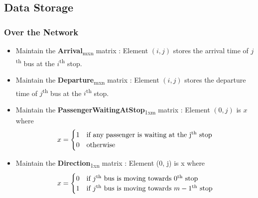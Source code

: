 \subsection{Data Storage}
\subsubsection{Over the Network}

\begin{itemize}

\item Maintain the \textbf{Arrival}\textsubscript{mxn} matrix : Element $(i, j)$ stores the arrival time of $j$\textsuperscript{th} bus at the $i$\textsuperscript{th} stop.
\item Maintain the \textbf{Departure}\textsubscript{mxn} matrix : Element $(i, j)$ stores the departure time of $j$\textsuperscript{th} bus at the $i$\textsuperscript{th} stop.
\item Maintain the \textbf{PassengerWaitingAtStop}\textsubscript{1xm} matrix : Element $(0, j)$ is $x$ where
 \[ x = \begin{cases} \mbox{1} & \mbox{if any passenger is waiting at the j\textsuperscript{th} stop}  \\ \mbox{0} & \mbox{otherwise} \end{cases} \]
\item Maintain the \textbf{Direction}\textsubscript{1xn} matrix : Element (0, j) is x where
 \[ x = \begin{cases} \mbox{0} & \mbox{if $j$\textsuperscript{th} bus is moving towards $0$\textsuperscript{th} stop}  \\ \mbox{1} & \mbox{if $j$\textsuperscript{th} bus is moving towards $m-1$\textsuperscript{th} stop} \end{cases} \]


\end{itemize}